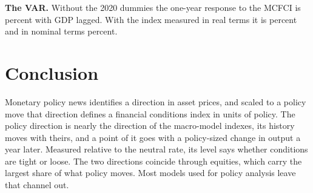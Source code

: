 \documentclass[11pt]{article}
\begin{document}
\textbf{The VAR.} Without the 2020 dummies the one-year response to the MCFCI is  percent with GDP lagged. With the index measured in real terms it is  percent and in nominal terms  percent.

\section{Conclusion}\label{sec:conclusion}
Monetary policy news identifies a direction in asset prices, and scaled to a policy move that direction defines a financial conditions index in units of policy. The policy direction is nearly the direction of the macro-model indexes, its history moves with theirs, and a point of it goes with a policy-sized change in output a year later. Measured relative to the neutral rate, its level says whether conditions are tight or loose. The two directions coincide through equities, which carry the largest share of what policy moves. Most models used for policy analysis leave that channel out.

\FloatBarrier


\end{document}
